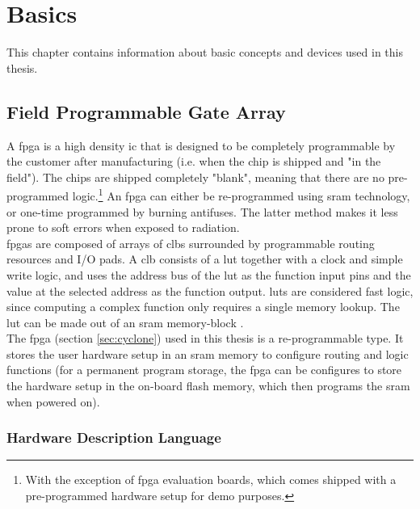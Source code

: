 \documentclass[main.tex]{subfiles}
\begin{document}
\chapter{Basics}

This chapter contains information about basic concepts and devices used in this thesis.

\section{Field Programmable Gate Array} \label{sec:fpga}

A \gls{fpga} is a high density \gls{ic} that is designed to be completely programmable by the customer after manufacturing (i.e. when the chip is shipped and "in the field"). The chips are shipped completely "blank", meaning that there are no pre-programmed logic.\footnote{With the exception of \gls{fpga} evaluation boards, which comes shipped with a pre-programmed hardware setup for demo purposes.} An \gls{fpga} can either be re-programmed using \gls{sram} technology, or one-time programmed by burning antifuses. The latter method makes it less prone to soft errors when exposed to radiation.\\

\Glspl{fpga} are composed of arrays of \glspl{clb} surrounded by programmable routing resources and I/O pads. A \gls{clb} consists of a \gls{lut} together with a clock and simple write logic, and uses the address bus of the \gls{lut} as the function input pins and the value at the selected address as the function output. \glspl{lut} are considered fast logic, since computing a complex function only requires a single memory lookup. The \gls{lut} can be made out of an \gls{sram} memory-block \cite{weste11}. \\

The \gls{fpga} (section \ref{sec:cyclone}) used in this thesis is a re-programmable type. It stores the user hardware setup in an \gls{sram} memory to configure routing and logic functions (for a permanent program storage, the \gls{fpga} can be configures to store the hardware setup in the on-board \gls{flash} memory, which then programs the \gls{sram} when powered on).

\subsection{Hardware Description Language}
\end{document}
